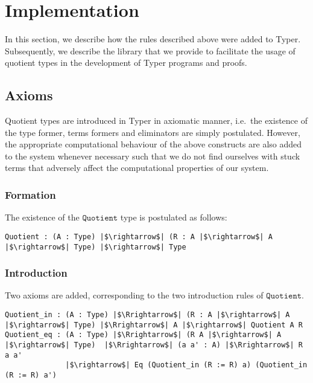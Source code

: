 \documentclass[12pt,twoside,maitrise]{dms}
\theoremstyle{definition}
\numberwithin{equation}{section}
\numberwithin{table}{chapter}
\numberwithin{figure}{chapter}
\newcommand\id[1] {\texttt{#1}}
\begin{document}
\section{Implementation}

In this section, we describe how the rules described above were added to Typer.
Subsequently, we describe the library that we provide to facilitate the usage of
quotient types in the development of Typer programs and proofs.

\subsection{Axioms}

Quotient types are introduced in Typer in axiomatic manner, i.e.\ the existence
of the type former, terms formers and eliminators are simply postulated.
However, the appropriate computational behaviour of the above constructs are
also added to the system whenever necessary such that we do not find ourselves
with stuck terms that adversely affect the computational properties of our
system.

\subsubsection*{Formation}
The existence of the $\id{Quotient}$ type is postulated as follows:

\begin{verbatim}
Quotient : (A : Type) |$\rightarrow$| (R : A |$\rightarrow$| A |$\rightarrow$| Type) |$\rightarrow$| Type
\end{verbatim}

\subsubsection*{Introduction}
Two axioms are added, corresponding to the two introduction rules of $\id{Quotient}$.

\begin{verbatim}
Quotient_in : (A : Type) |$\Rrightarrow$| (R : A |$\rightarrow$| A |$\rightarrow$| Type) |$\Rrightarrow$| A |$\rightarrow$| Quotient A R
Quotient_eq : (A : Type) |$\Rrightarrow$| (R A |$\rightarrow$| A |$\rightarrow$| Type)  |$\Rrightarrow$| (a a' : A) |$\Rrightarrow$| R a a'
              |$\rightarrow$| Eq (Quotient_in (R := R) a) (Quotient_in (R := R) a')
\end{verbatim}
\end{document}
